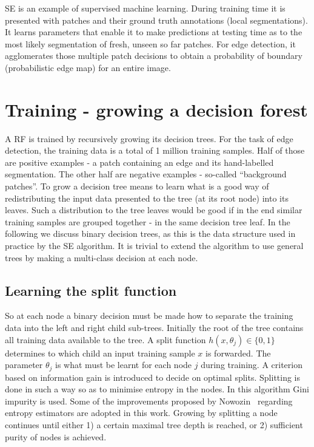 SE is an example of supervised machine learning. During training time it is presented with patches and their ground truth annotations (local segmentations). It learns parameters that enable it to make predictions at testing time as to the most likely segmentation of fresh, unseen so far patches. For edge detection, it agglomerates those multiple patch decisions to obtain a probability of boundary (probabilistic edge map) for an entire image.

\section{Training - growing a decision forest}
A RF is trained by recursively growing its decision trees. For the task of edge detection, the training data is a total of 1 million training samples. Half of those are positive examples - a patch containing an edge and its hand-labelled segmentation. The other half are negative examples - so-called ``background patches''. To grow a decision tree means to learn what is a good way of redistributing the input data presented to the tree (at its root node) into its leaves. Such a distribution to the tree leaves would be good if in the end similar training samples are grouped together - in the same decision tree leaf. In the following we discuss binary decision trees, as this is the data structure used in practice by the SE algorithm. It is trivial to extend the algorithm to use general trees by making a multi-class decision at each node. 

\subsection{Learning the split function}
So at each node a binary decision must be made how to separate the training data into the left and right child sub-trees. Initially the root of the tree contains all training data available to the tree. A split function $h(x,\theta_j)\in\{0,1\}$ determines to which child an input training sample $x$ is forwarded. The parameter $\theta_j$ is what must be learnt for each node $j$ during training. A criterion based on information gain is introduced to decide on optimal %
splits. Splitting is done in such a way so as to minimise entropy in the nodes. In this algorithm Gini impurity is used. Some of the improvements proposed by Nowozin~\cite{Nowozin12improvedinformation,nowozin2014decision} regarding entropy estimators are adopted in this work. Growing by splitting a node continues until either 1) a certain maximal tree depth is reached, or 2) sufficient purity of nodes is achieved.

